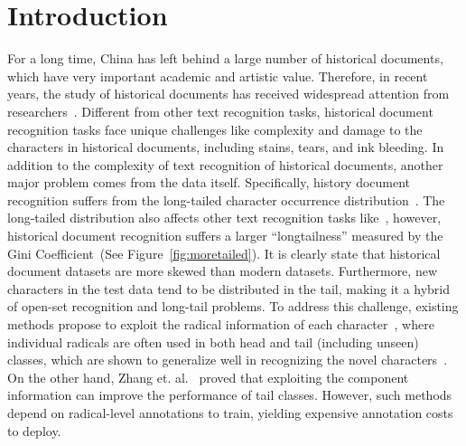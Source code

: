 \section{Introduction}

For a long time, China has left behind a large number of historical documents, which have very important academic and artistic value. 
Therefore, in recent years, the study of historical documents has received widespread attention from researchers~\cite{jinic21,hde,obc306}. 
Different from other text recognition tasks, historical document recognition tasks face unique challenges like complexity and damage to the characters in historical documents, including stains, tears, and ink bleeding. 
In addition to the complexity of text recognition of historical documents, another major problem comes from the data itself. Specifically, history document recognition suffers from the long-tailed character occurrence distribution~\cite{obcmk2}. 
The long-tailed distribution also affects other text recognition tasks like~\cite{fudanvi}, however, historical document recognition suffers a larger ``longtailness'' measured by the Gini Coefficient~\cite{tailsurvey}(See Figure~\ref{fig:moretailed}). 
It  is clearly state that historical document datasets are more skewed than modern datasets.
Furthermore, new characters in the test data tend to be distributed in the tail\cite{jinic21}, making it a hybrid of open-set recognition and long-tail problems.
To address this challenge, existing methods propose to exploit the radical information of each character~\cite{denseran}, where individual radicals are often used in both head and tail (including unseen) classes, which are shown to generalize well in recognizing the novel characters~\cite{fewran,zhang20pr}.
On the other hand, Zhang et. al.~\cite{sanicdar23}  proved that exploiting the component information can improve the performance of tail classes.
However, such methods depend on radical-level annotations to train, yielding expensive annotation costs to deploy.

